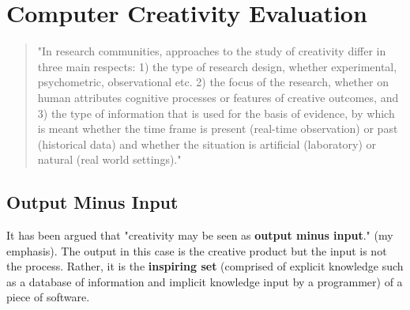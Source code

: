\section{Computer Creativity Evaluation}

\begin{quote}
"In research communities, approaches to the study of creativity differ in three main respects: 1) the type of research design, whether experimental, psychometric, observational etc. 2) the focus of the research, whether on human attributes cognitive processes or features of creative outcomes, and 3) the type of information that is used for the basis of evidence, by which is meant whether the time frame is present (real-time observation) or past (historical data) and whether the situation is artificial (laboratory) or natural (real world settings)." \citep[p.3]{Candy2012}
\end{quote}

\subsection{Output Minus Input}

	It has been argued that "creativity may be seen as \textbf{output minus input}." \citep[p.2]{Pease2001}(my emphasis). The output in this case is the creative product but the input is not the process. Rather, it is the \textbf{inspiring set} (comprised of explicit knowledge such as a database of information and implicit knowledge input by a programmer) of a piece of software.

